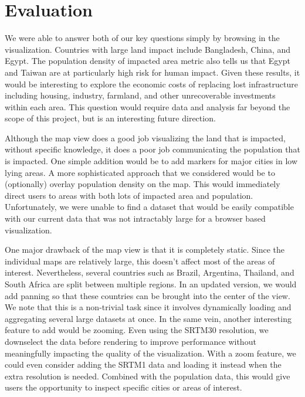 \documentclass[12pt]{article}
\begin{document}
	\section{Evaluation}
		We were able to answer both of our key questions simply by browsing in the visualization.
		Countries with large land impact include Bangladesh, China, and Egypt.
		The population density of impacted area metric also tells us that Egypt and Taiwan are at particularly high risk for human impact.
		Given these results, it would be interesting to explore the economic costs of replacing lost infrastructure including housing, industry, farmland, and other unrecoverable investments within each area.
		This question would require data and analysis far beyond the scope of this project, but is an interesting future direction.

		Although the map view does a good job visualizing the land that is impacted, without specific knowledge, it does a poor job communicating the population that is impacted.
		One simple addition would be to add markers for major cities in low lying areas.
		A more sophisticated approach that we considered would be to (optionally) overlay population density on the map.
		This would immediately direct users to areas with both lots of impacted area and population.
		Unfortunately, we were unable to find a dataset that would be easily compatible with our current data that was not intractably large for a browser based visualization.

		One major drawback of the map view is that it is completely static.
		Since the individual maps are relatively large, this doesn't affect most of the areas of interest.
		Nevertheless, several countries such as Brazil, Argentina, Thailand, and South Africa are split between multiple regions.
		In an updated version, we would add panning so that these countries can be brought into the center of the view.
		We note that this is a non-trivial task since it involves dynamically loading and aggregating several large datasets at once.
		In the same vein, another interesting feature to add would be zooming.
		Even using the SRTM30 resolution, we downselect the data before rendering to improve performance without meaningfully impacting the quality of the visualization.
		With a zoom feature, we could even consider adding the SRTM1 data and loading it instead when the extra resolution is needed.
		Combined with the population data, this would give users the opportunity to inspect specific cities or areas of interest.
\end{document}
